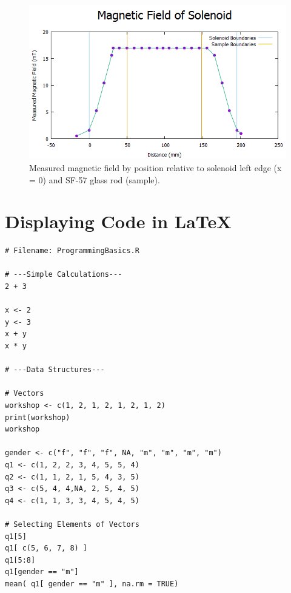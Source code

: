 \documentclass[12pt]{article}
\begin{document}
\begin{figure}[H]
\centering
\includegraphics[width=.75\textwidth]{Solenoid_Hall_Probe3.png}
\caption{Measured magnetic field by position relative to solenoid left edge (x = 0) and SF-57 glass rod (sample).}
\label{figure:1}
\end{figure}

\newpage


\section*{Displaying Code in \LaTeX}


\begin{verbatim}
# Filename: ProgrammingBasics.R
 
# ---Simple Calculations---
2 + 3
 
x <- 2
y <- 3
x + y
x * y
 
# ---Data Structures---
 
# Vectors
workshop <- c(1, 2, 1, 2, 1, 2, 1, 2)
print(workshop)
workshop
 
gender <- c("f", "f", "f", NA, "m", "m", "m", "m")
q1 <- c(1, 2, 2, 3, 4, 5, 5, 4)
q2 <- c(1, 1, 2, 1, 5, 4, 3, 5)
q3 <- c(5, 4, 4,NA, 2, 5, 4, 5)
q4 <- c(1, 1, 3, 3, 4, 5, 4, 5)
 
# Selecting Elements of Vectors
q1[5]
q1[ c(5, 6, 7, 8) ]
q1[5:8]
q1[gender == "m"]
mean( q1[ gender == "m" ], na.rm = TRUE)
\end{verbatim}


\end{document}
